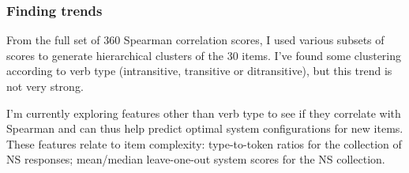 \documentclass[xcolor={dvipsnames}]{beamer}
\begin{document}
\begin{frame}
\end{frame}

\begin{frame}
\frametitle{Finding trends}
From the full set of 360 Spearman correlation scores, I used various subsets of scores to generate hierarchical clusters of the 30 items. I've found some clustering according to verb type (intransitive, transitive or ditransitive), but this trend is not very strong.

\medskip

\medskip
I'm currently exploring features other than verb type to see if they correlate with Spearman and can thus help predict optimal system configurations for new items. These features relate to item complexity: type-to-token ratios for the collection of NS responses; mean/median leave-one-out system scores for the NS collection.
\end{frame}
\end{document}
